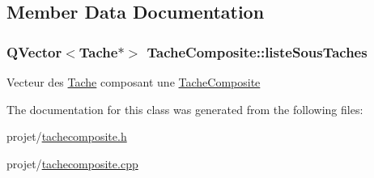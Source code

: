 \subsection{Member Data Documentation}
\hypertarget{class_tache_composite_ac73545ce9cef80cbdc145a233465df6e}{}
\subsubsection[{liste\+Sous\+Taches}]{\setlength{\rightskip}{0pt plus 5cm}Q\+Vector$<${\bf Tache}$\ast$$>$ Tache\+Composite\+::liste\+Sous\+Taches\hspace{0.3cm}{\ttfamily [private]}}\label{class_tache_composite_ac73545ce9cef80cbdc145a233465df6e}
Vecteur des \hyperlink{class_tache}{Tache} composant une \hyperlink{class_tache_composite}{Tache\+Composite} 

The documentation for this class was generated from the following files\+:\begin{DoxyCompactItemize}
\item 
projet/\hyperlink{tachecomposite_8h}{tachecomposite.\+h}\item 
projet/\hyperlink{tachecomposite_8cpp}{tachecomposite.\+cpp}\end{DoxyCompactItemize}
